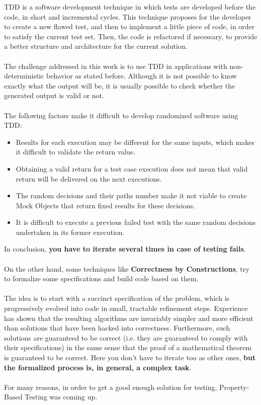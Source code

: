 \documentclass{report}
\theoremstyle{definition}
\theoremstyle{definition}
\begin{document}
TDD is a software development technique in which tests are developed before the code, in short and incremental cycles. This technique proposes for the developer to create a new flawed test, and then to implement a little piece of code, in order to satisfy the current test set. Then, the code is refactored if necessary, to provide a better structure and architecture for the current solution. \\\\
The challenge addressed in this work is to use TDD in applications with non-deterministic behavior as stated before. Although it is not possible to know exactly what the output will be, it is usually possible to check whether the generated output is valid or not.\\\\
The following factors make it difficult to develop randomized software using TDD: 
\begin{itemize}
	\item Results for each execution may be different for the same inputs, which makes it difficult to validate the return value.
	\item Obtaining a valid return for a test case execution does not mean that valid return will be delivered on the next executions.
	\item The random decisions and their paths number make it not viable to create Mock Objects that return fixed results for these decisions.
	\item It is difficult to execute a previous failed test with the same random decisions undertaken in its former execution.
\end{itemize}
In conclusion, \textbf{you have to iterate several times in case of testing fails}. \\\\
On the other hand, some techniques like \textbf{Correctness by Constructions}, try to formalize some specifications and build code based on them.\\\\
The idea is to start with a succinct specification of the problem, which is progressively evolved into code in small, tractable refinement steps. Experience has shown that the resulting algorithms are invariably simpler and more efficient than solutions that have been hacked into correctness. Furthermore, such solutions are guaranteed to be correct (i.e. they are guaranteed to comply with their specifications) in the same sense that the proof of a mathematical theorem is guaranteed to be correct. Here you don't have to iterate too as other ones, \textbf{but the formalized process is, in general, a complex task}.\\\\
For many reasons, in order to get a good enough solution for testing, Property-Based Testing was coming up.
\end{document}
